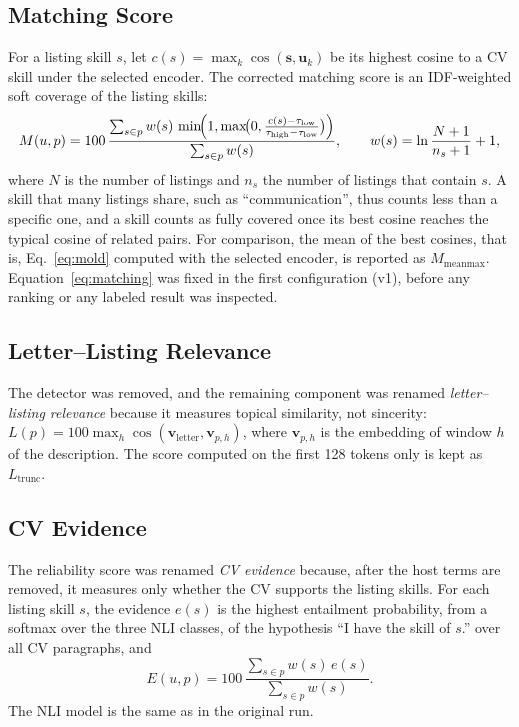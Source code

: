 \documentclass[CHICAGO]{USG}
\begin{document}
\subsection{Matching Score}
\label{sec:matching}
For a listing skill $s$, let $c(s)=\max_k\cos(\mathbf{s},\mathbf{u}_k)$ be its highest cosine to a CV skill under the selected encoder. The corrected matching score is an IDF-weighted soft coverage of the listing skills:
\begin{equation}
M(u,p) = 100\,\frac{\sum_{s\in p} w(s)\,\min\!\Bigl(1,\max\!\bigl(0,\tfrac{c(s)-\tau_{\mathrm{low}}}{\tau_{\mathrm{high}}-\tau_{\mathrm{low}}}\bigr)\Bigr)}{\sum_{s\in p} w(s)},\qquad
w(s) = \ln\frac{N+1}{n_s+1}+1,
\label{eq:matching}
\end{equation}
where $N$ is the number of listings and $n_s$ the number of listings that contain $s$. A skill that many listings share, such as ``communication'', thus counts less than a specific one, and a skill counts as fully covered once its best cosine reaches the typical cosine of related pairs. %
For comparison, the mean of the best cosines, that is, Eq.~\eqref{eq:mold} computed with the selected encoder, is reported as $M_{\mathrm{meanmax}}$. Equation~\eqref{eq:matching} was fixed in the first configuration (v1), before any ranking or any labeled result was inspected. %

\subsection{Letter--Listing Relevance}
\label{sec:letter}
The detector was removed, and the remaining component was renamed \emph{letter--listing relevance} because it measures topical similarity, not sincerity: $L(p)=100\max_{h}\cos(\mathbf{v}_{\mathrm{letter}},\mathbf{v}_{p,h})$, where $\mathbf{v}_{p,h}$ is the embedding of window $h$ of the description. %
The score computed on the first 128 tokens only is kept as $L_{\mathrm{trunc}}$.

\subsection{CV Evidence}
\label{sec:evidence}
The reliability score was renamed \emph{CV evidence} because, after the host terms are removed, it measures only whether the CV supports the listing skills. For each listing skill $s$, the evidence $e(s)$ is the highest entailment probability, from a softmax over the three NLI classes, of the hypothesis ``I have the skill of $s$.'' over all CV paragraphs, and
\begin{equation}
E(u,p) = 100\,\frac{\sum_{s\in p} w(s)\,e(s)}{\sum_{s\in p} w(s)}.
\label{eq:evidence}
\end{equation}
The NLI model is the same as in the original run.
\end{document}
